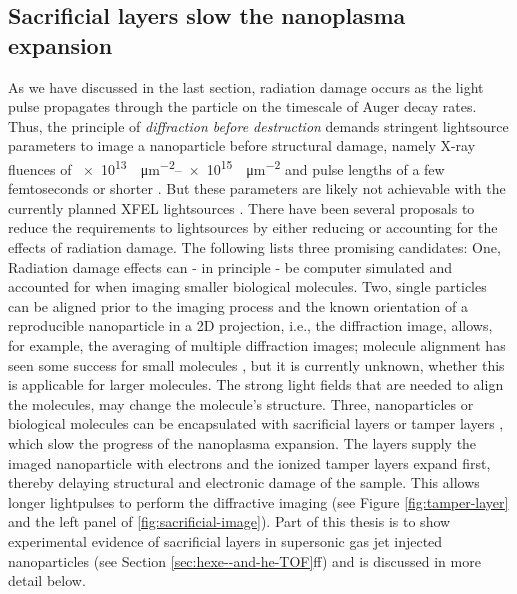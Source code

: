 \subsection{Sacrificial layers slow the nanoplasma expansion}\label{sec:tampered-layers}
%
%
%
As we have discussed in the last section, radiation damage occurs as the light pulse propagates through the particle on the timescale of Auger decay rates. Thus, the principle of \textit{diffraction before destruction} \citep{Neutze-2000-Nature} demands stringent lightsource parameters to image a nanoparticle before structural damage, namely X-ray fluences of \SIrange{e13}{e15}{\photons\per\square\micro\meter} and pulse lengths of a few femtoseconds or shorter \citep{Hau-Riege-2005-PRE}. But these parameters are likely not achievable with the currently planned XFEL lightsources \citep{Huldt-2003-JSB}. There have been several proposals to reduce the requirements to lightsources \citep{Aquila-2015-StrucDyn} by either reducing or accounting for the effects of radiation damage. The following lists three promising candidates: One, Radiation damage effects can - in principle - be computer simulated and accounted for when imaging smaller biological molecules. Two, single particles can be aligned prior to the imaging process \citep{Hau-Riege-2005-PRE} and the known orientation of a reproducible nanoparticle in a 2D projection, i.e., the diffraction image, allows, for example, the averaging of multiple diffraction images; molecule alignment has seen some success for small molecules \citep{Kupper-2014-PRL}, but it is currently unknown, whether this is applicable for larger molecules. The strong light fields that are needed to align the molecules, may change the molecule's structure. Three, nanoparticles or biological molecules can be encapsulated with sacrificial layers or tamper layers \citep{Hau-Riege-2007-PRL}, which slow the progress of the nanoplasma expansion. The layers supply the imaged nanoparticle with electrons and the ionized tamper layers expand first, thereby delaying structural and electronic damage of the sample. This allows longer lightpulses to perform the diffractive imaging (see Figure \ref{fig:tamper-layer} and the left panel of \ref{fig:sacrificial-image}). Part of this thesis is to show experimental evidence of sacrificial layers in supersonic gas jet injected nanoparticles (see Section \ref{sec:hexe--and-he-TOF}ff) and is discussed in more detail below.\\[1\baselineskip]
